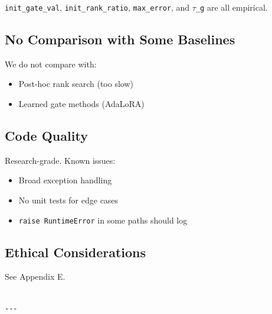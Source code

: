 \texttt{init\_gate\_val}, \texttt{init\_rank\_ratio}, \texttt{max\_error}, and \texttt{$\tau$\_g} are all empirical.

\subsection{No Comparison with Some Baselines}

We do not compare with:
\begin{itemize}
\item Post-hoc rank search (too slow)
\item Learned gate methods (AdaLoRA)

\end{itemize}
\subsection{Code Quality}

Research-grade. Known issues:
\begin{itemize}
\item Broad exception handling
\item No unit tests for edge cases
\item \texttt{raise RuntimeError} in some paths should log

\end{itemize}
\subsection{Ethical Considerations}

See Appendix E.
\begin{lstlisting}

---
\end{lstlisting}